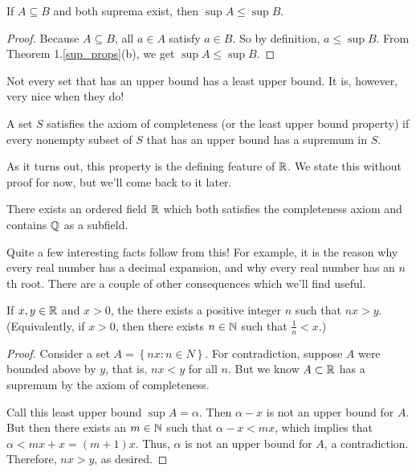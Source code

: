 \documentclass[../m131main.tex]{subfiles}
\begin{document}
\begin{theorem}[]
    If $A \subseteq B$ and both suprema exist, then $\sup A \leq \sup B$.
\end{theorem}

\begin{proof}
    Because $A \subseteq B$, all $a \in A$ satisfy $a \in B$.
    So by definition, $a \leq \sup B$.
    From Theorem 1.\ref{sup_props}(b), we get $\sup A \leq \sup B$.
\end{proof}

Not every set that has an upper bound has a least upper bound.
It is, however, very nice when they do!

\begin{definition}
    A set $S$ satisfies the axiom of completeness (or the least upper bound property) if every nonempty subset of $S$ that has an upper bound has a supremum in $S$.
\end{definition}

As it turns out, this property is the defining feature of $\R$.
We state this without proof for now, but we'll come back to it later.

\begin{theorem}[Completeness of $\R$]
    There exists an ordered field $\R$ which both satisfies the completeness axiom and contains $\mathbb{Q}$ as a subfield.
\end{theorem}

Quite a few interesting facts follow from this!
For example, it is the reason why every real number has a decimal expansion, and why every real number has an $n$th root.
There are a couple of other consequences which we'll find useful.

\begin{theorem}
    If $x,y \in \mathbb{R}$ and $x > 0$, the there exists a positive integer $n$ such that $nx > y$.
    (Equivalently, if $x > 0$, then there exists $n \in \mathbb{N}$ such that $\frac{1}{n} < x$.)
\end{theorem}

\begin{proof}
    Consider a set $A = \left\{ nx : n \in N \right\}$.
    For contradiction, suppose $A$ were bounded above by $y$, that is, $nx < y$ for all $n$.
    But we know $A \subset \mathbb{R}$ has a supremum by the axiom of completeness.

    Call this least upper bound $\sup A = \alpha$.
    Then $\alpha - x$ is not an upper bound for $A$.
    But then there exists an $m \in \mathbb{N}$ such that $\alpha - x < mx$, which implies that $\alpha < mx + x = (m+1)x$.
    Thus, $\alpha$ is not an upper bound for $A$, a contradiction.
    Therefore, $nx > y$, as desired.
\end{proof}
\end{document}
